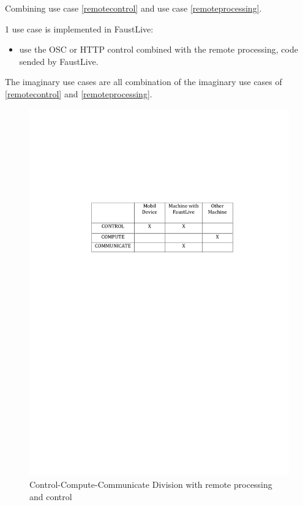 \documentclass[a4paper]{article}
\begin{document}
Combining use case {\ref{remotecontrol}} and use case {\ref{remoteprocessing}}.

1 use case is implemented in FaustLive:
\begin{itemize}
\item use the OSC or HTTP control combined with the remote processing, code sended by FaustLive.
\end{itemize}

The imaginary use cases are all combination of the imaginary use cases of {\ref{remotecontrol}} and {\ref{remoteprocessing}}.

\begin{figure}[!h]
\begin{center}
\includegraphics[width=0.7\columnwidth]{images/5CCC}
\caption{Control-Compute-Communicate Division with remote processing and control}
\label{fig:5CCC}
\end{center}
\end{figure}
\end{document}
